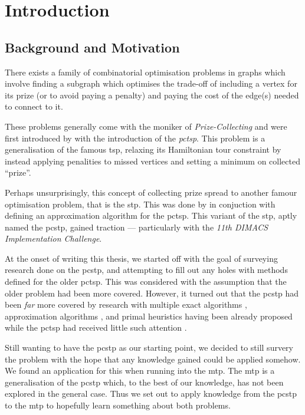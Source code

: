 
\chapter{Introduction}
\section{Background and Motivation}
\label{sec:intro:background}
There exists a family of combinatorial optimisation problems in graphs which involve
finding a subgraph which optimises the trade-off of including a vertex for its prize
(or to avoid paying a penalty) and paying the cost of the edge(s) needed to connect
to it.

These problems generally come with the moniker of \textit{Prize-Collecting}
and were first introduced by \citet*{balas1989prize}
with the introduction of the \textit{\gls{pctsp}}. This problem is a generalisation of
the famous \gls{tsp}, relaxing its Hamiltonian tour constraint by instead applying penalities
to missed vertices and setting a minimum on collected ``prize''.

Perhaps unsurprisingly, this concept of collecting prize spread to another famour optimisation
problem, that is the \gls{stp}. This was done by \citet{Bienstock1993} in conjuction with
defining an approximation algorithm for the \gls{pctsp}. This variant of the \gls{stp},
aptly named the \gls{pcstp}, gained traction --- particularly with the
\textit{11th DIMACS Implementation Challenge}\citep{DIMACS}.

At the onset of writing this thesis, we started off with the goal of surveying research done
on the \gls{pcstp}, and attempting to fill out any holes with methods defined for the older
\gls{pctsp}. This was considered with the assumption that the older problem had
been more covered.
However, it turned out that the \gls{pcstp} had been \textit{far} more covered
by research with multiple exact algorithms
\citep{ljubic2005solving, leitner2016dual, gamrath2017scip},
approximation algorithms \citep{Bienstock1993,goemans1995general,Johnson:2000:PCS:338219.338637},
and primal heuristics \citep{canuto2001local,fu2014knowledge,akhmedov2016divide}
having been already proposed while the \gls{pctsp} had received little such attention
\citep{archetti2014chapter}.

Still wanting to have the \gls{pcstp} as our starting point, we decided to still survery the
problem with the hope that any knowledge gained could be applied somehow. We found an application
for this when running into the \gls{mtp}. The \gls{mtp} is a generalisation of the \gls{pcstp}
which, to the best of our knowledge, has not been explored in the general case. Thus we set out
to apply knowledge from the \gls{pcstp} to the \gls{mtp} to hopefully learn something about
both problems.
